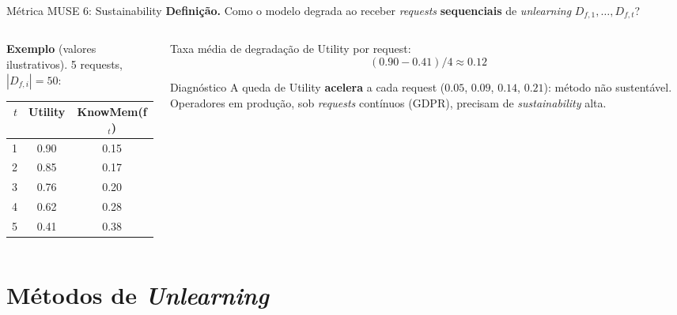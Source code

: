 \documentclass[aspectratio=169,xcolor=dvipsnames]{beamer}
\begin{document}
  \begin{frame}{Métrica MUSE 6: Sustainability}
    \textbf{Definição.} Como o modelo degrada ao receber \textit{requests} \textbf{sequenciais} de \textit{unlearning} $D_{f,1}, \ldots, D_{f,t}$?

    \vspace{0.2em}
    \begin{columns}[T]
      \begin{column}{0.42\textwidth}
        \footnotesize \textbf{Exemplo} (valores ilustrativos). 5 requests, $|D_{f,i}| = 50$:
        \vspace{0.2em}

        \centering
        \begin{tabular}{@{}rcc@{}}
          \toprule
          $t$ & Utility & KnowMem(f$_t$) \\
          \midrule
          1 & 0.90 & 0.15 \\
          2 & 0.85 & 0.17 \\
          3 & 0.76 & 0.20 \\
          4 & 0.62 & 0.28 \\
          5 & 0.41 & 0.38 \\
          \bottomrule
        \end{tabular}
      \end{column}
      \begin{column}{0.54\textwidth}
        Taxa média de degradação de Utility por request:
        \[
          (0.90 - 0.41)/4 \approx \mathbf{0.12}
        \]

        \begin{alertblock}{Diagnóstico}
          \footnotesize A queda de Utility \textbf{acelera} a cada request ($0.05$, $0.09$, $0.14$, $0.21$): método não sustentável. Operadores em produção, sob \textit{requests} contínuos (GDPR), precisam de \textit{sustainability} alta.
        \end{alertblock}
      \end{column}
    \end{columns}
  \end{frame}

  \section{Métodos de \textit{Unlearning}}
\end{document}
